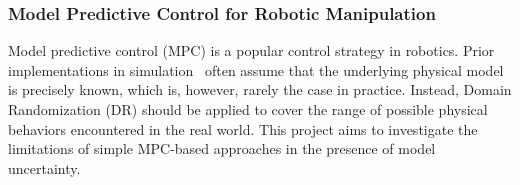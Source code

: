 \documentclass[a4paper]{article}
\begin{document}



\subsubsection{Model Predictive Control for Robotic Manipulation}

Model predictive control (MPC) is a popular control strategy in robotics. 
Prior implementations in simulation~\cite{MujocoMPC} often assume that the underlying physical model is precisely known, 
which is, however, rarely the case in practice. 
Instead, Domain Randomization (DR) should be applied to cover the range of possible physical behaviors encountered in the real world.
This project aims to investigate the limitations of simple MPC-based approaches in the presence of model uncertainty.
\end{document}
